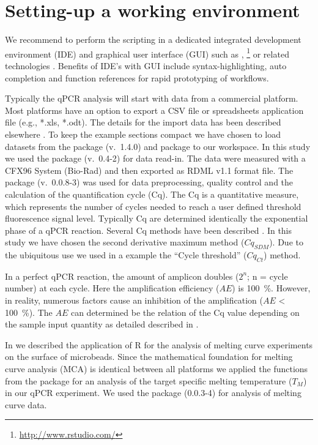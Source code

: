 \section{Setting-up a working environment}

We recommend to perform the scripting in a dedicated integrated development 
environment (IDE) and graphical user interface (GUI) such as  
\citep{rodiger_rkward_2012}, 
\footnote{\url{http://www.rstudio.com/}} or related technologies 
\citep{Valero_2012}. Benefits of IDE's with GUI include syntax-highlighting, 
auto completion and function references for rapid prototyping of workflows.

Typically the qPCR analysis will start with data from a commercial platform. 
Most platforms have an option to export a CSV file or spreadsheets application 
file (e.g., *.xls, *.odt). The details for the import data has been described 
elsewhere \citep{RDCT2010c, rodiger_rkward_2012}. To keep the example sections 
compact we have chosen to load datasets from the  package 
\citep{ritz_2008, spiess_2008} (v.~1.4.0) and  package to our 
workspace. In this study we used the  package (v.~0.4-2) for data 
read-in. The data were measured with a CFX96 System (Bio-Rad) and then exported 
as RDML v1.1 format file. The  package (v.~0.0.8-3) was used 
for data preprocessing, quality control and  the calculation of the 
quantification cycle (Cq). The Cq is a quantitative measure, which represents 
the number of cycles needed to reach a user defined threshold fluorescence 
signal level. Typically Cq are determined identically the exponential phase of a 
qPCR reaction. Several Cq methods have been described \citep{ruijter_2013}. In 
this study we have chosen the second derivative maximum method ($Cq_{SDM}$). Due to 
the ubiquitous use we used in a example the ``Cycle threshold'' ($Cq_{Ct}$) method.

In a perfect qPCR reaction, the amount of amplicon doubles ($2^{n}$; n = cycle 
number) at each cycle. Here the amplification efficiency ($AE$) is 100~\%. 
However, in reality, numerous factors cause an inhibition of the amplification 
($AE$ < 100~\%).  The $AE$ can determined be the relation of the Cq value depending 
on the sample input quantity as detailed described in \citep{roediger_chippcr_2014}.

In \citet{roediger_RJ_2013} we described the application of R for the analysis of 
melting curve experiments on the surface of microbeads. Since the mathematical 
foundation for melting curve analysis (MCA) is identical between all platforms 
we applied the functions from the  package 
\citep{roediger_RJ_2013} for an analysis of the target specific melting 
temperature ($T_{M}$) in our qPCR experiment. We used the  
package (0.0.3-4) for analysis of melting curve data.

